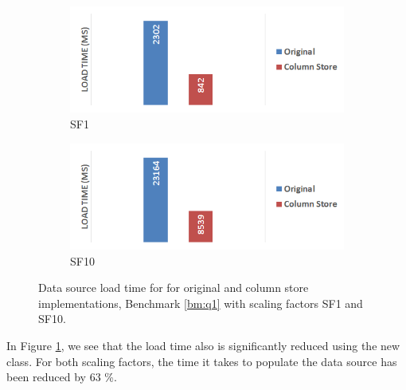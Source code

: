 \begin{figure}
    \centering
    \begin{subfigure}{0.7\textwidth}
        \includegraphics[width=\textwidth]{img/column-store-load-sf001.png}
        \caption{SF1}
    \end{subfigure}
    \begin{subfigure}{0.7\textwidth}
        \includegraphics[width=\textwidth]{img/column-store-load-sf010.png}
        \caption{SF10}
    \end{subfigure}
    \caption{Data source load time for for original and column store implementations, Benchmark \ref{bm:q1} with scaling factors SF1 and SF10.}
    \label{fig:column-store-load}
\end{figure}
In Figure \ref{fig:column-store-load}, we see that the load time also is significantly reduced using the new  class. For both scaling factors, the time it takes to populate the data source has been reduced by 63 \%. 


